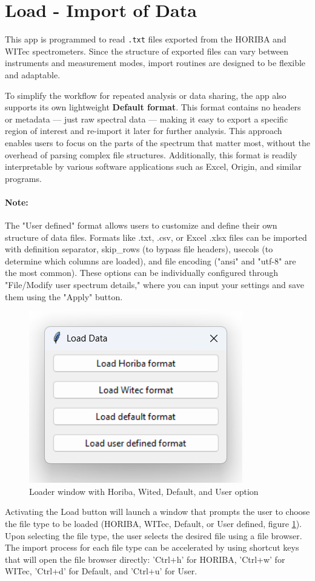 \section{Load - Import of Data}

This app is programmed to read \texttt{.txt} files exported from the HORIBA and WITec spectrometers. Since the structure of exported files can vary between instruments and measurement modes, import routines are designed to be flexible and adaptable.

To simplify the workflow for repeated analysis or data sharing, the app also supports its own lightweight \textbf{Default format}. This format contains no headers or metadata — just raw spectral data — making it easy to export a specific region of interest and re-import it later for further analysis. This approach enables users to focus on the parts of the spectrum that matter most, without the overhead of parsing complex file structures. Additionally, this format is readily interpretable by various software applications such as Excel, Origin, and similar programs.

\paragraph{Note:} The "User defined" format allows users to customize and define their own structure of data files. Formats like .txt, .csv, or Excel .xlsx files can be imported with definition separator, skip\_rows (to bypass file headers), usecols (to determine which columns are loaded), and file encoding ("ansi" and "utf-8" are the most common). These options can be individually configured through "File/Modify user spectrum details," where you can input your settings and save them using the "Apply" button.

\begin{figure}[H]
    \centering
    \includegraphics[width=0.35\linewidth]{Resources/Loader_window.png}
    \caption{Loader window with Horiba, Wited, Default, and User option}
    \label{loader_window}
\end{figure}

Activating the Load button will launch a window that prompts the user to choose the file type to be loaded (HORIBA, WITec, Default, or User defined, figure \ref{loader_window}). Upon selecting the file type, the user selects the desired file using a file browser. The import process for each file type can be accelerated by using shortcut keys that will open the file browser directly: 'Ctrl+h' for HORIBA, 'Ctrl+w' for WITec, 'Ctrl+d' for Default, and 'Ctrl+u' for User.

